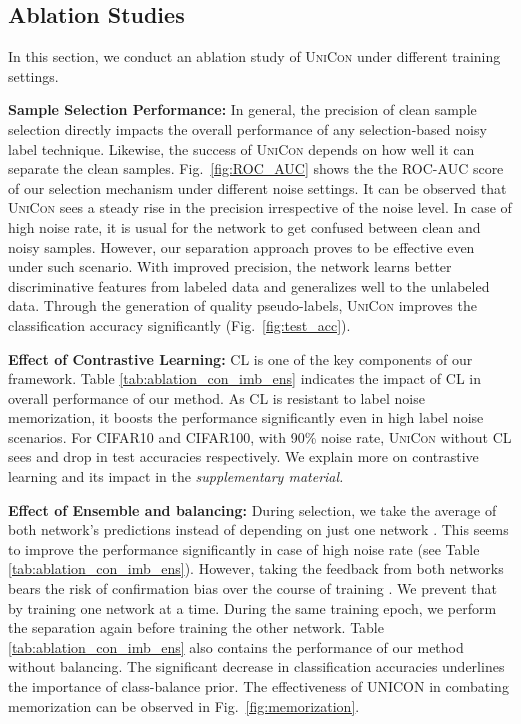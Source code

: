 \documentclass[10pt,twocolumn,letterpaper]{article}
\begin{document}
\subsection{Ablation Studies}
In this section, we conduct an ablation study of \textsc{UniCon} under different training settings.

 \textbf{Sample Selection Performance:}
In general, the precision of clean sample selection directly impacts the overall performance of any selection-based noisy label technique. Likewise, the success of \textsc{UniCon} depends on how well it can separate the clean samples. Fig.~\ref{fig:ROC_AUC} shows the the ROC-AUC score of our selection mechanism under different noise settings. It can be observed that \textsc{UniCon} sees a steady rise in the precision irrespective of the noise level. In case of high noise rate, it is usual for the network to get confused between clean and noisy samples. However, our separation approach proves to be effective even under such scenario. With improved precision, the network learns better discriminative features from labeled data and generalizes well to the unlabeled data. Through the generation of quality pseudo-labels, \textsc{UniCon} improves the classification accuracy significantly (Fig.~\ref{fig:test_acc}).   

 \textbf{Effect of Contrastive Learning:} 
CL is one of the key components of our framework. Table \ref{tab:ablation_con_imb_ens} indicates the impact of CL in overall performance of our method. As CL is resistant to label noise memorization, it boosts the performance significantly even in high label noise scenarios. For CIFAR10 and CIFAR100, with 90\% noise rate, \textsc{UniCon} without CL sees  and  drop in test accuracies respectively. We explain more on contrastive learning and its impact in the {\em supplementary material.}




 \textbf{Effect of Ensemble and balancing:}
During selection, we take the average of both network's predictions instead of depending on just one network \cite{han2018co}. This seems to improve the performance significantly in case of high noise rate (see Table \ref{tab:ablation_con_imb_ens}). However, taking the feedback from both networks bears the risk of confirmation bias over the course of training \cite{li2020dividemix}. We prevent that by training one network at a time. During the same training epoch, we perform the separation again before training the other network. Table \ref{tab:ablation_con_imb_ens} also contains the performance of our method without balancing. The significant decrease in classification accuracies underlines the importance of class-balance prior. The effectiveness of \textsc{UNICON} in combating memorization can be observed in Fig.~\ref{fig:memorization}.       
\end{document}
